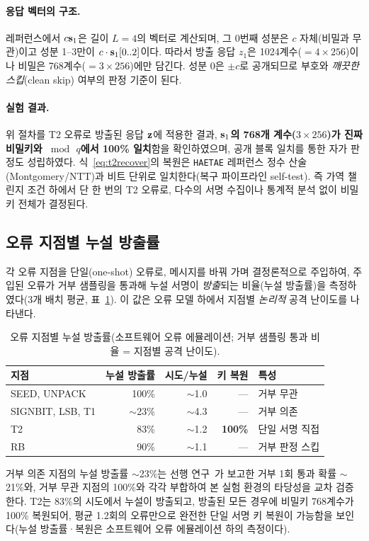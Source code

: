 \paragraph{응답 벡터의 구조.} 레퍼런스에서 $c\mathbf{s}_1$은 길이 $L=4$의 벡터로 계산되며, 그 0번째 성분은
$c$ 자체(비밀과 무관)이고 성분 1--3만이 $c\cdot\mathbf{s}_1[0..2]$이다. 따라서 방출 응답 $z_1$은
1024계수($=4\times256$)이나 비밀은 768계수($=3\times256$)에만 담긴다. 성분 0은 $\pm c$로 공개되므로
부호와 \emph{깨끗한 스킵}(clean skip) 여부의 판정 기준이 된다.

\paragraph{실험 결과.} 위 절차를 T2 오류로 방출된 응답 $\mathbf{z}$에 적용한 결과, \textbf{$\mathbf{s}_1$의 768개
계수($3\times256$)가 진짜 비밀키와 $\bmod\,q$에서 100\% 일치}함을 확인하였으며, 공개 블록 일치를 통한
자가 판정도 성립하였다. 식~\eqref{eq:t2recover}의 복원은 \texttt{HAETAE} 레퍼런스 정수 산술
(Montgomery/NTT)과 비트 단위로 일치한다(복구 파이프라인 self-test). 즉 가역 챌린지 조건 하에서 단 한
번의 T2 오류로, 다수의 서명 수집이나 통계적 분석 없이 비밀키 전체가 결정된다.

\subsection{오류 지점별 누설 방출률}
\label{subsec:repro}
각 오류 지점을 단일(one-shot) 오류로, 메시지를 바꿔 가며 결정론적으로 주입하여, 주입된 오류가 거부
샘플링을 통과해 누설 서명이 \emph{방출}되는 비율(누설 방출률)을 측정하였다(3개 배치 평균,
표~\ref{tab:repro}). 이 값은 오류 모델 하에서 지점별 \emph{논리적}
공격 난이도를 나타낸다.

\begin{table}[H]\centering
\caption{오류 지점별 누설 방출률(소프트웨어 오류 에뮬레이션; 거부 샘플링 통과 비율 = 지점별 공격 난이도).}
\label{tab:repro}
\small
\begin{tabular}{@{}lrrrl@{}}
\toprule
지점 & 누설 방출률 & 시도/누설 & 키 복원 & 특성 \\
\midrule
SEED, UNPACK        & 100\% & $\sim$1.0 & --- & 거부 무관 \\
SIGNBIT, LSB, T1    & $\sim$23\% & $\sim$4.3 & --- & 거부 의존 \\
T2                  & 83\% & $\sim$1.2 & \textbf{100\%} & 단일 서명 직접 \\
RB                  & 90\% & $\sim$1.1 & --- & 거부 판정 스킵 \\
\bottomrule
\end{tabular}
\end{table}

거부 의존 지점의 누설 방출률 $\sim$23\%는 선행 연구~\cite{lee2026haetae}가 보고한 거부 1회 통과 확률
$\sim$21\%와, 거부 무관 지점의 100\%와 각각 부합하여 본 실험 환경의 타당성을 교차 검증한다. T2는
83\%의 시도에서 누설이 방출되고, 방출된 모든 경우에 비밀키 768계수가 100\% 복원되어, 평균 1.2회의
오류만으로 완전한 단일 서명 키 복원이 가능함을 보인다(누설 방출률·복원은 소프트웨어 오류 에뮬레이션 하의 측정이다).
